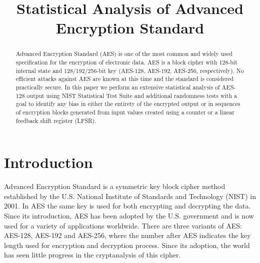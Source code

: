 \documentclass[conference]{IEEEtran}
\begin{document}
\title{Statistical Analysis of Advanced Encryption Standard}
\author{
\and
{}
\and
{}
\and
{}
}

\maketitle

\begin{abstract}
Advanced Encryption Standard (AES) is one of the most common and widely used specification for the encryption of electronic data. AES is a block cipher with 128-bit internal state and 128/192/256-bit key (AES-128, AES-192, AES-256, respectively). No efficient attacks against AES are known at this time and the standard is considered practically secure. In this paper we perform an extensive statistical analysis of AES-128 output using NIST Statistical Test Suite and additional randomness tests with a goal to identify any bias in either the entirety of the encrypted output or in sequences of encryption blocks generated from input values created using a counter or a linear feedback shift register (LFSR). 
\end{abstract}

\IEEEpeerreviewmaketitle

\section{Introduction}

Advanced Encryption Standard is a symmetric key block cipher method established by the U.S. National Institute of Standards and Technology (NIST) in 2001. In AES the same key is used for both encrypting and decrypting the data. Since its introduction, AES has been adopted by the U.S. government and is now used for a variety of applications worldwide. There are three variants of AES: AES-128, AES-192 and AES-256, where the number after AES
indicates the key length used for encryption and decryption process. Since its adoption, the world has seen little progress in the cryptanalysis of this cipher.
\end{document}
